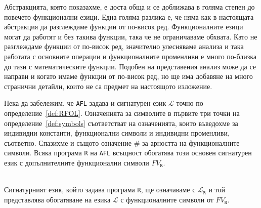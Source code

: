 \documentclass[12pt,twoside,a4paper]{article}
\begin{document}
	Абстракцията, която показахме, е доста обща и се доближава в голяма степен до повечето функционални езици. Една голяма разлика е, че няма как в настоящата абстракция да разглеждаме функции от по-висок ред. Функционалните езици могат да работят и без такива функции, така че не ограничаваме обхвата. Като не разглеждаме функции от по-висок ред, значително улесняваме анализа и така работата с основните операции и функционалните променливи е много по-близка до тази с математическите функции. Подобен на представения анализ може да се направи и когато имаме функции от по-висок ред, но ще има добавяне на много странични детайли, които не са предмет на настоящото изложение.
	
	Нека да забележим, че \texttt{AFL} задава и сигнатурен език $\mathcal{L}$ точно по определение~\ref{def:RFOL}. Означенията за символите в първите три точки на определение~\ref{def:symbols} съответстват на означенията, които въведохме за индивидни константи, функционални символи и индивидни променливи, съответно. Спазихме и същото означение $\#$ за арността на функционалните символи. Всяка програма \texttt{R} на \texttt{AFL} всъщност обогатява този основен сигнатурен език с допълнителните функционални символи $FV_\texttt{R}$.
	
	\begin{denotation}~\\
		\indent Сигнатурният език, който задава програма \texttt{R}, ще означаваме с $\mathcal{L}_\texttt{R}$ и той представлява обогатяване на езика $\mathcal{L}$ с функционалните символи от $FV_\texttt{R}$.
	\end{denotation}
	
\end{document}
